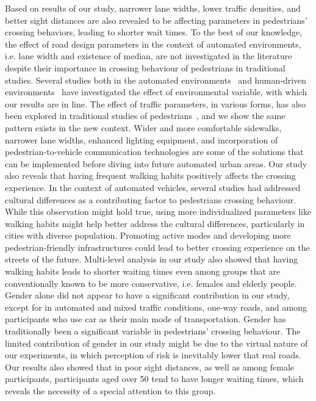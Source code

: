 Based on results of our study, narrower lane widths, lower traffic densities, and better sight distances are also revealed to be affecting parameters in pedestrians' crossing behaviors, leading to shorter wait times. To the best of our knowledge, the effect of road design parameters in the context of automated environments, i.e. lane width and existence of median, are not investigated in the literature despite their importance in crossing behaviour of pedestrians in traditional studies. Several studies both in the automated environments~\citep{rasouli2019autonomous} and human-driven environments~\citep{sun2015estimation} have investigated the effect of environmental variable, with which our results are in line. The effect of traffic parameters, in various forms, has also been explored in traditional studies of pedestrians~\citep{schmidt2009pedestrians,ishaque2008behavioural}, and we show the same pattern exists in the new context. Wider and more comfortable sidewalks, narrower lane widths, enhanced lighting equipment, and incorporation of pedestrian-to-vehicle communication technologies are some of the solutions that can be implemented before diving into future automated urban areas. Our study also reveals that having frequent walking habits positively affects the crossing experience. In the context of automated vehicles, several studies had addressed cultural differences as a contributing factor to pedestrians crossing behaviour. While this observation might hold true, using more individualized parameters like walking habits might help better address the cultural differences, particularly in cities with diverse population. Promoting active modes and developing more pedestrian-friendly infrastructures could lead to better crossing experience on the streets of the future. Multi-level analysis in our study also showed that having walking habits leads to shorter waiting times even among groups that are conventionally known to be more conservative, i.e. females and elderly people. Gender alone did not appear to have a significant contribution in our study, except for in automated and mixed traffic conditions, one-way roads, and among participants who use car as their main mode of transportation. Gender has traditionally been a significant variable in pedestrians' crossing behaviour. The limited contribution of gender in our study might be due to the virtual nature of our experiments, in which perception of risk is inevitably lower that real roads. Our results also showed that in poor sight distances, as well as among female participants, participants aged over 50 tend to have longer waiting times, which reveals the necessity of a special attention to this group.
